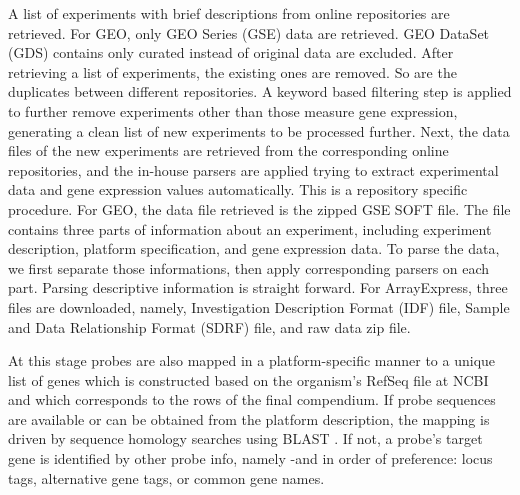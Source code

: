A list of experiments with brief descriptions from online repositories are
retrieved.  For GEO, only GEO Series (GSE) data are retrieved.  GEO DataSet
(GDS) contains only curated instead of original data are excluded.
%
After retrieving a list of experiments, the existing ones are removed. So are
the duplicates between different repositories.
%
A keyword based filtering step is applied to further remove experiments other
than those measure gene expression, generating a clean list of new experiments
to be processed further.
%
Next, the data files of the new experiments are retrieved from the
corresponding online repositories, and the in-house parsers are applied trying
to extract experimental data and gene expression values automatically.  This is
a repository specific procedure.
%
For GEO, the data file retrieved is the zipped GSE SOFT file.  The file
contains three parts of information about an experiment, including experiment
description, platform specification, and gene expression data.
%
To parse the data, we first separate those informations, then apply 
corresponding parsers on each part. 
%
Parsing descriptive information is straight forward. 
%
%
%
For ArrayExpress, three files are downloaded, namely, Investigation Description
Format (IDF) file, Sample and Data Relationship Format (SDRF) file, and raw
data zip file.









At this stage probes are also mapped in a platform-specific manner to a unique 
list of genes which is constructed based on the organism's RefSeq file at NCBI 
\cite{Pruitt2007} and which corresponds to the rows of the final compendium. 
If probe sequences are available or can be obtained from the platform 
description, the mapping is driven by sequence homology searches using 
BLAST \cite{Altschul1997}. 
%
If not, a probe's target gene is identified by other probe info, namely -and in 
order of preference: locus tags, alternative gene tags, or common gene names.




